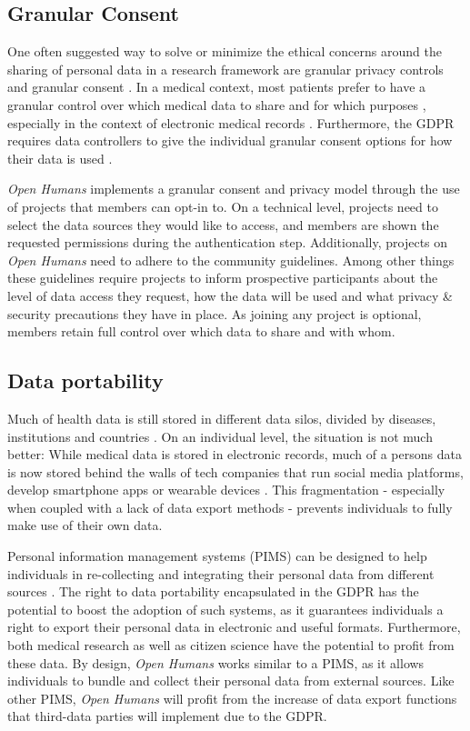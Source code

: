\documentclass[a4paper,num-refs]{oup-contemporary}
\begin{document}
\subsection{Granular Consent}
One often suggested way to solve or minimize the ethical concerns around the sharing of personal data in a research framework are granular privacy controls and granular consent \cite{Evans2017}. In a medical context, most patients prefer to have a granular control over which medical data to share and for which purposes \cite{Grando2017}, especially in the context of electronic medical records \cite{Caine2013}. Furthermore, the GDPR requires data controllers to give the individual granular consent options for how their data is used \cite{Nati2018}.

\textit{Open Humans} implements a granular consent and privacy model through the use of projects that members can opt-in to. On a technical level, projects need to select the data sources they would like to access, and members are shown the requested permissions during the authentication step.
Additionally, projects on \textit{Open Humans} need to adhere to the community guidelines. Among other things these guidelines require projects to inform prospective participants about the level of data access they request, how the data will be used and what privacy \& security precautions they have in place. As joining any project is optional, members retain full control over which data to share and with whom.

\subsection{Data portability}
Much of health data is still stored in different data silos, divided by diseases, institutions and countries \cite{ga4gh2016}. On an individual level, the situation is not much better: While medical data is stored in electronic records, much of a persons data is now stored behind the walls of tech companies that run social media platforms, develop smartphone apps or wearable devices \cite{Althoff2017}. This fragmentation - especially when coupled with a lack of data export methods - prevents individuals to fully make use of their own data. 

Personal information management systems (PIMS) can be designed to help individuals in re-collecting and integrating their personal data from different sources \cite{Allard2017}. The right to data portability encapsulated in the GDPR has the potential to boost the adoption of such systems, as it guarantees individuals a right to export their personal data in electronic and useful formats. Furthermore, both medical research \cite{Rumbold2017} as well as citizen science \cite{Quinn2018} have the potential to profit from these data. By design, \textit{Open Humans} works similar to a PIMS, as it allows individuals to bundle and collect their personal data from external sources. Like other PIMS, \textit{Open Humans} will profit from the increase of data export functions that third-data parties will implement due to the GDPR. 
\end{document}
